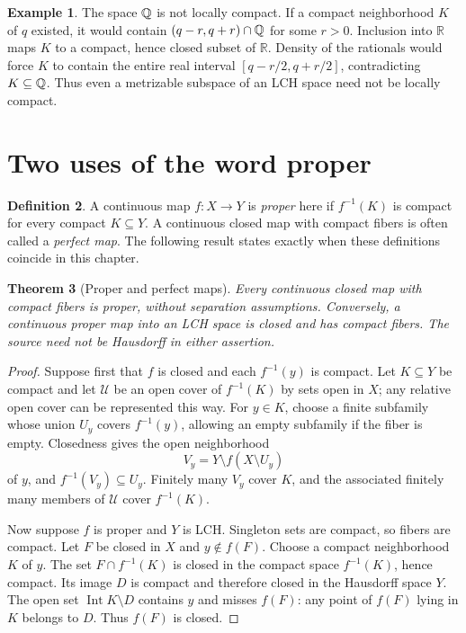 \documentclass[11pt,oneside,openany]{book}
\newtheorem{theorem}{Theorem}[chapter]
\theoremstyle{definition}
\newtheorem{definition}[theorem]{Definition}
\newtheorem{example}[theorem]{Example}
\theoremstyle{remark}
\newcommand{\R}{\mathbb R}\newcommand{\C}{\mathbb C}
\DeclareMathOperator{\Int}{Int}
\begin{document}
\begin{example}\label{d10:11:rationals}
The space $\mathbb Q$ is not locally compact. If a compact neighborhood $K$ of $q$ existed, it would contain $(q-r,q+r)\cap\mathbb Q$ for some $r>0$. Inclusion into $\R$ maps $K$ to a compact, hence closed subset of $\R$. Density of the rationals would force $K$ to contain the entire real interval $[q-r/2,q+r/2]$, contradicting $K\subseteq\mathbb Q$. Thus even a metrizable subspace of an LCH space need not be locally compact.
\end{example}

\section{Two uses of the word proper}

\begin{definition}\label{d10:11:proper}
A continuous map $f:X\to Y$ is \emph{proper} here if $f^{-1}(K)$ is compact for every compact $K\subseteq Y$. A continuous closed map with compact fibers is often called a \emph{perfect map}. The following result states exactly when these definitions coincide in this chapter.
\end{definition}

\begin{theorem}[Proper and perfect maps]\label{d10:11:proper-perfect}
Every continuous closed map with compact fibers is proper, without separation assumptions. Conversely, a continuous proper map into an LCH space is closed and has compact fibers. The source need not be Hausdorff in either assertion.
\end{theorem}
\begin{proof}
Suppose first that $f$ is closed and each $f^{-1}(y)$ is compact. Let $K\subseteq Y$ be compact and let $\mathcal U$ be an open cover of $f^{-1}(K)$ by sets open in $X$; any relative open cover can be represented this way. For $y\in K$, choose a finite subfamily whose union $U_y$ covers $f^{-1}(y)$, allowing an empty subfamily if the fiber is empty. Closedness gives the open neighborhood
\[
 V_y=Y\setminus f(X\setminus U_y)
\]
of $y$, and $f^{-1}(V_y)\subseteq U_y$. Finitely many $V_y$ cover $K$, and the associated finitely many members of $\mathcal U$ cover $f^{-1}(K)$.

Now suppose $f$ is proper and $Y$ is LCH. Singleton sets are compact, so fibers are compact. Let $F$ be closed in $X$ and $y\notin f(F)$. Choose a compact neighborhood $K$ of $y$. The set $F\cap f^{-1}(K)$ is closed in the compact space $f^{-1}(K)$, hence compact. Its image $D$ is compact and therefore closed in the Hausdorff space $Y$. The open set $\Int K\setminus D$ contains $y$ and misses $f(F)$: any point of $f(F)$ lying in $K$ belongs to $D$. Thus $f(F)$ is closed.
\end{proof}
\end{document}

